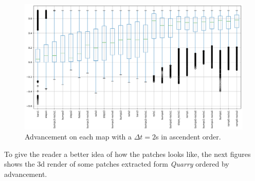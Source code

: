 \documentclass[../document.tex]{subfiles}
\begin{document}
\begin{figure}[H]
    \centering
    \includegraphics[width=\linewidth]{../img/datasets/box_for_each_map.png}
    \caption{Advancement on each map with a $\Delta t = 2$s in ascendent order.}
\end{figure}
To give the reader a better idea of how the patches looks like, the next figures shows the 3d render of some patches extracted form \emph{Quarry} ordered by advancement.
\end{document}
